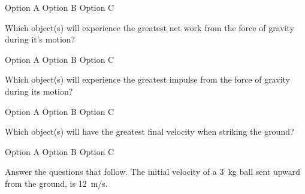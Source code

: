 \documentclass[]{exam}
\begin{document}
\begin{questions}
\begin{randomizechoices}[norandomize]
    \choice Option A
    \choice Option B
    \correctchoice Option C
\end{randomizechoices}


\question
Which object(s) will experience the greatest net work from the force of gravity during it’s motion?

\begin{randomizechoices}[norandomize]
    \choice Option A
    \correctchoice Option B
    \choice Option C
\end{randomizechoices}


\question
Which object(s) will experience the greatest impulse from the force of gravity during its motion?


\begin{randomizechoices}[norandomize]
    \choice Option A %
    \correctchoice Option B
    \choice Option C
\end{randomizechoices}



\question \label{aOLAP}
Which object(s) will have the greatest final velocity when striking the ground?

\begin{randomizechoices}[norandomize]
    \choice Option A
    \correctchoice Option B
    \choice Option C
\end{randomizechoices}



\question
Answer the questions that follow. The initial velocity of a \SI{3}{kg} ball sent upward from the ground, is \SI{12}{m/s}. 

\end{questions}
\end{document}
